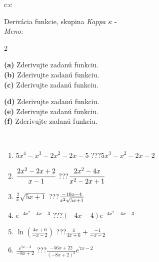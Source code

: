 \documentclass[10pt]{report}
\begin{document}
\newpage
\thispagestyle{empty}
\begin{tabular}{c:c}
\begin{minipage}[c][104.5mm][t]{0.5\linewidth}
\begin{center}
\vspace{7mm}
{\huge Derivácia funkcie, skupina \textit{Kappa $\kappa$} -}\\[5mm]
\textit{Meno:}\phantom{xxxxxxxxxxxxxxxxxxxxxxxxxxxxxxxxxxxxxxxxxxxxxxxxxxxxxxxxxxxxxxxxx}\\[5mm]
\begin{minipage}{0.95\linewidth}
\begin{center}
{\small \begin{multicols}{2} \raggedright
\textbf{(a)} Zderivujte zadanú funkciu. \\[1mm]
\textbf{(b)} Zderivujte zadanú funkciu. \\[1mm]
\textbf{(c)} Zderivujte zadanú funkciu. \par \columnbreak
\textbf{(d)} Zderivujte zadanú funkciu. \\[1mm]
\textbf{(e)} Zderivujte zadanú funkciu. \\[1mm]
\textbf{(f)} Zderivujte zadanú funkciu.
\end{multicols}
}
\end{center}
\end{minipage}
\\[4mm]
\begin{minipage}{0.79\linewidth}
\begin{center}
\begin{varwidth}{\linewidth}
\begin{enumerate}
\normalsize
\item $5x^4-x^3-2x^2-2x-5$\quad \dotfill\; ???\;\dotfill \quad $5x^3-x^2-2x-2$
\item $\cfrac{2x^2-2x+2}{x-1}$\quad \dotfill\; ???\;\dotfill \quad $\cfrac{2x^2-4x}{x^2-2x+1}$
\item $\frac{2}{x}\sqrt{5x+1}$\quad \dotfill\; ???\;\dotfill \quad $\frac{-10x-4}{x^2 \sqrt{\smash[b]{5x+1}}}$
\item $e^{-4x^2-4x-3}$\quad \dotfill\; ???\;\dotfill \quad $(-4x-4)e^{-4x^2-4x-3}$
\item $\ln{\left(\frac{4x+6}{-x-2}\right)}$\quad \dotfill\; ???\;\dotfill \quad $\frac{4}{4x+6}+\frac{-1}{-x-2}$
\item $\frac{e^{7x-2}}{-8x+2}$\quad \dotfill\; ???\;\dotfill \quad $\frac{-56x+22}{(-8x+2)^2}e^{7x-2}$
\end{enumerate}

\end{varwidth}
\end{center}
\end{minipage}
\end{center}
\end{minipage}
\end{tabular}
\end{document}
